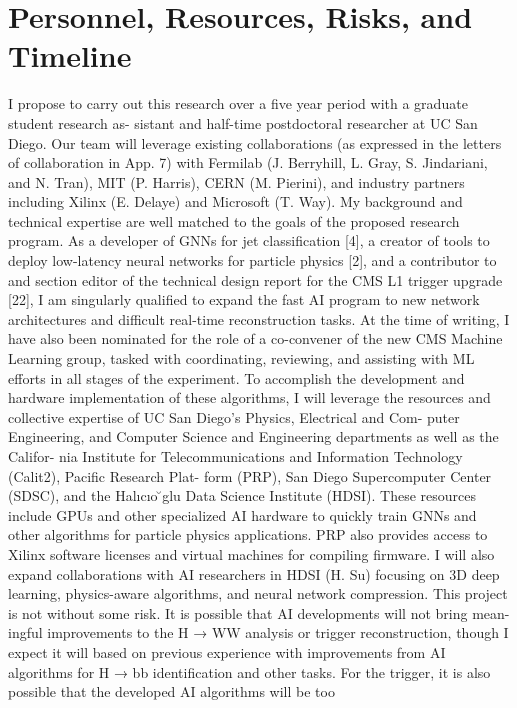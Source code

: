 \section{Personnel, Resources, Risks, and Timeline}

I propose to carry out this research over a five year period with a graduate student research as-
sistant and half-time postdoctoral researcher at UC San Diego. Our team will leverage existing
collaborations (as expressed in the letters of collaboration in App. 7) with Fermilab (J. Berryhill,
L. Gray, S. Jindariani, and N. Tran), MIT (P. Harris), CERN (M. Pierini), and industry partners
including Xilinx (E. Delaye) and Microsoft (T. Way).
My background and technical expertise are well matched to the goals of the proposed research
program. As a developer of GNNs for jet classification [4], a creator of tools to deploy low-latency
neural networks for particle physics [2], and a contributor to and section editor of the technical
design report for the CMS L1 trigger upgrade [22], I am singularly qualified to expand the fast
AI program to new network architectures and difficult real-time reconstruction tasks. At the time
of writing, I have also been nominated for the role of a co-convener of the new CMS Machine
Learning group, tasked with coordinating, reviewing, and assisting with ML efforts in all stages
of the experiment.
To accomplish the development and hardware implementation of these algorithms, I will
leverage the resources and collective expertise of UC San Diego’s Physics, Electrical and Com-
puter Engineering, and Computer Science and Engineering departments as well as the Califor-
nia Institute for Telecommunications and Information Technology (Calit2), Pacific Research Plat-
form (PRP), San Diego Supercomputer Center (SDSC), and the Halıcıo  ̆glu Data Science Institute
(HDSI). These resources include GPUs and other specialized AI hardware to quickly train GNNs
and other algorithms for particle physics applications. PRP also provides access to Xilinx software
licenses and virtual machines for compiling firmware. I will also expand collaborations with AI
researchers in HDSI (H. Su) focusing on 3D deep learning, physics-aware algorithms, and neural
network compression.
This project is not without some risk. It is possible that AI developments will not bring mean-
ingful improvements to the H → WW analysis or trigger reconstruction, though I expect it will
based on previous experience with improvements from AI algorithms for H → bb identification
and other tasks. For the trigger, it is also possible that the developed AI algorithms will be too
